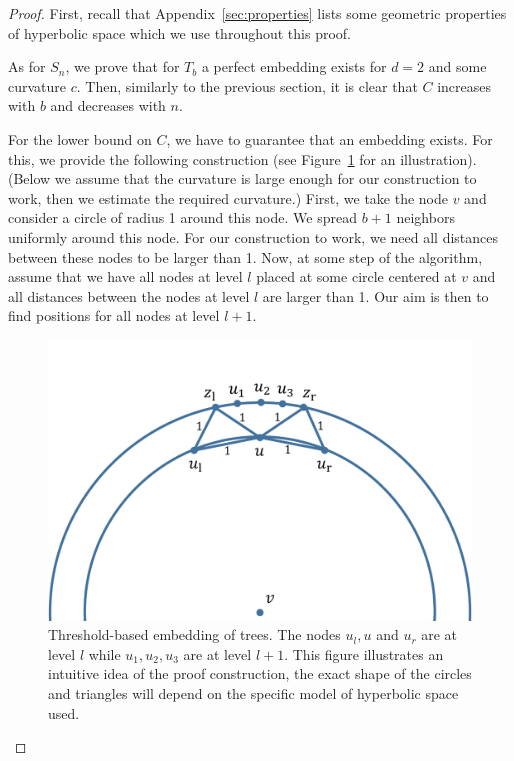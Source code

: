 \documentclass[runningheads]{llncs}
\begin{document}
\begin{proof}
First, recall that Appendix~\ref{sec:properties} lists some geometric properties of hyperbolic space which we use throughout this proof.

As for $S_n$, we prove that for $T_b$ a perfect embedding exists for $d = 2$ and some curvature $c$. Then, similarly to the previous section, it is clear that $C$ increases with $b$ and decreases with $n$.




For the lower bound on $C$, we have to guarantee that an embedding exists. For this, we provide the following construction (see Figure~\ref{fig:trees} for an illustration).
(Below we assume that the curvature is large enough for our construction to work, then we estimate the required curvature.)
First, we take the node $v$ and consider a circle of radius 1 around this node. 
We spread $b + 1$ neighbors uniformly around this node. For our construction to work, we need all distances between these nodes to be larger than 1.
Now, at some step of the algorithm, assume that we have all nodes at level $l$ placed at some circle centered at $v$ and all distances between the nodes at level $l$ are larger than 1. Our aim is then to find positions for all nodes at level $l + 1$.

\begin{figure}[t]
    \centering
    \includegraphics[width = 0.5 \textwidth]{trees.pdf}
    \caption{Threshold-based embedding of trees. The nodes $u_l, u$ and $u_r$ are at level $l$ while $u_1,u_2,u_3$ are at level $l+1$. This figure illustrates an intuitive idea of the proof construction, the exact shape of the circles and triangles will depend on the specific model of hyperbolic space used.}
    \label{fig:trees}
\end{figure}



\end{proof}
\end{document}
